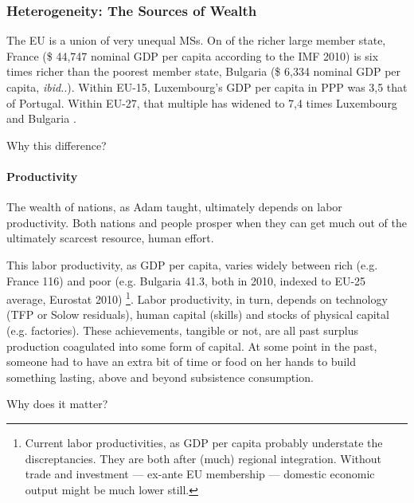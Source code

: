\documentclass[11pt,a4paper,oneside]{article}
\begin{document}
\subsubsection[Heterogeneity]{Heterogeneity: The Sources of Wealth} \label{sec:sources-of-wealth} The \gls{EU} is a union of very unequal \glspl{MS}. 
On of the richer large member state, France (\$ 44,747 nominal \gls{GDP} per capita according to the IMF 2010) is six times richer than the poorest member state, Bulgaria (\$ 6,334 nominal \gls{GDP} per capita, \emph{ibid.}.). 
Within \gls{EU}-15, Luxembourg's \gls{GDP} per capita in \gls{PPP} was 3,5 that of Portugal. 
Within \gls{EU}-27, that multiple has widened to 7,4 times Luxembourg and Bulgaria \citep[1]{Alber2008}. %

Why this difference?

\paragraph{Productivity} The wealth of nations, as Adam \cite{Smith-1776-lq} taught, ultimately depends on labor productivity. 
Both nations and people prosper when they can get much out of the ultimately scarcest resource, human effort. 

This labor productivity, as \gls{GDP} per capita, varies widely between rich (e.g. France 116) and poor (e.g. Bulgaria 41.3, both in 2010, indexed to EU-25 average, Eurostat 2010)
\footnote{
	Current labor productivities, as \gls{GDP} per capita probably understate the discreptancies. 
	They are both after (much) regional integration. 
	Without trade and investment --- ex-ante EU membership --- domestic economic output might be much lower still.
}. 
Labor productivity, in turn, depends on technology (\gls{TFP} or Solow residuals), human capital (skills) and stocks of physical capital (e.g. factories). 
These achievements, tangible or not, are all past surplus production coagulated into some form of capital. 
At some point in the past, someone had to have an extra bit of time or food on her hands to build something lasting, above and beyond subsistence consumption.

Why does it matter?
\end{document}
